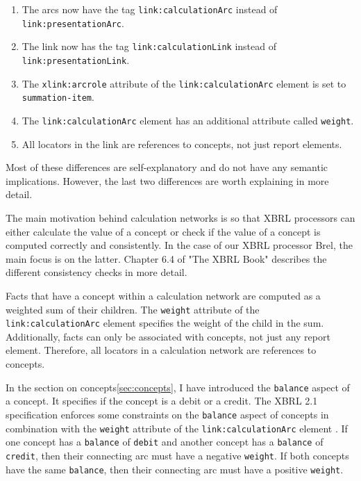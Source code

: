 \begin{enumerate}
    \item The arcs now have the tag \texttt{link:calculationArc} instead of \texttt{link:presentationArc}.
    \item The link now has the tag \texttt{link:calculationLink} instead of \texttt{link:presentationLink}.
    \item The \texttt{xlink:arcrole} attribute of the \texttt{link:calculationArc} element is set to \texttt{summation-item}.
    \item The \texttt{link:calculationArc} element has an additional attribute called \texttt{weight}.
    \item All locators in the link are references to concepts, not just report elements.
\end{enumerate}

Most of these differences are self-explanatory and do not have any semantic implications.
However, the last two differences are worth explaining in more detail.

The main motivation behind calculation networks is so that XBRL processors can either calculate the value of a concept or check if the value of a concept is computed correctly and consistently.
In the case of our XBRL processor Brel, the main focus is on the latter. 
Chapter 6.4 of "The XBRL Book" \cite{fourny2023xbrl} describes the different consistency checks in more detail.

Facts that have a concept within a calculation network are computed as a weighted sum of their children.
The \texttt{weight} attribute of the \texttt{link:calculationArc} element specifies the weight of the child in the sum.
Additionally, facts can only be associated with concepts, not just any report element.
Therefore, all locators in a calculation network are references to concepts.

In the section on concepts\ref{sec:concepts}, I have introduced the \texttt{balance} aspect of a concept.
It specifies if the concept is a debit or a credit.
The XBRL 2.1 specification enforces some constraints on the \texttt{balance} aspect of concepts in combination with the \texttt{weight} attribute of the \texttt{link:calculationArc} element \cite{xbrl21_concept}.
If one concept has a \texttt{balance} of \texttt{debit} and another concept has a \texttt{balance} of \texttt{credit}, then their connecting arc must have a negative \texttt{weight}.
If both concepts have the same \texttt{balance}, then their connecting arc must have a positive \texttt{weight}.

